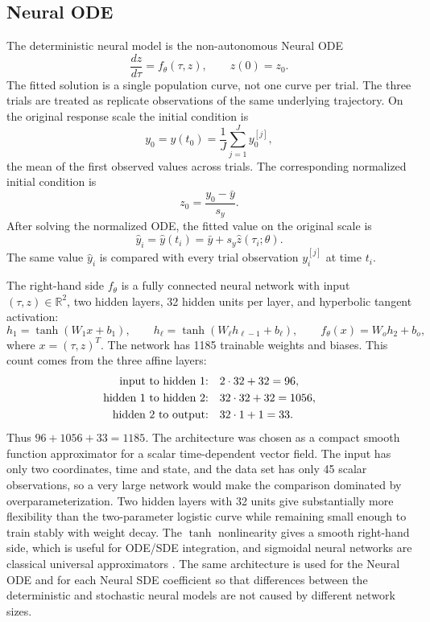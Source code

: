 \documentclass[11pt]{article}
\begin{document}
\subsection{Neural ODE}

The deterministic neural model is the non-autonomous Neural ODE
\citep{chen2018neuralode}
$$
  \frac{d z}{d\tau} = f_\theta(\tau,z),
  \qquad
  z(0)=z_0.
$$
The fitted solution is a single population curve, not one curve per trial. The
three trials are treated as replicate observations of the same underlying
trajectory. On the original response scale the initial condition is
$$
  y_0 = y(t_0)
  =
  \frac{1}{J}\sum_{j=1}^J y_0^{[j]},
$$
the mean of the first observed values across trials. The corresponding
normalized initial condition is
$$
  z_0 = \frac{y_0-\bar y}{s_y}.
$$
After solving the normalized ODE, the fitted value on the original scale is
$$
  \widehat y_i
  =
  \widehat y(t_i)
  =
  \bar y+s_y\widehat z(\tau_i;\theta).
$$
The same value $\widehat y_i$ is compared with every trial observation
$y_i^{[j]}$ at time $t_i$.

The right-hand side $f_\theta$ is a fully connected neural network with input
$(\tau,z)\in\mathbb R^2$, two hidden layers, 32 hidden units per layer, and
hyperbolic tangent activation:
$$
  h_1 = \tanh(W_1 x+b_1),\qquad
  h_{\ell}=\tanh(W_{\ell}h_{\ell-1}+b_{\ell}),\qquad
  f_\theta(x)=W_o h_2+b_o,
$$
where $x=(\tau,z)^T$. The network has 1185 trainable weights and biases.
This count comes from the three affine layers:
$$
\begin{aligned}
  \hbox{input to hidden 1:}&\quad 2\cdot 32+32=96,\\
  \hbox{hidden 1 to hidden 2:}&\quad 32\cdot 32+32=1056,\\
  \hbox{hidden 2 to output:}&\quad 32\cdot 1+1=33.
\end{aligned}
$$
Thus $96+1056+33=1185$. The architecture was chosen as a compact smooth
function approximator for a scalar time-dependent vector field. The input has
only two coordinates, time and state, and the data set has only 45 scalar
observations, so a very large network would make the comparison dominated by
overparameterization. Two hidden layers with 32 units give substantially more
flexibility than the two-parameter logistic curve while remaining small enough
to train stably with weight decay. The $\tanh$ nonlinearity gives a smooth
right-hand side, which is useful for ODE/SDE integration, and sigmoidal neural
networks are classical universal approximators \citep{cybenko1989approximation}.
The same architecture is used for the Neural ODE and for each Neural SDE
coefficient so that differences between the deterministic and stochastic neural
models are not caused by different network sizes.
\end{document}
